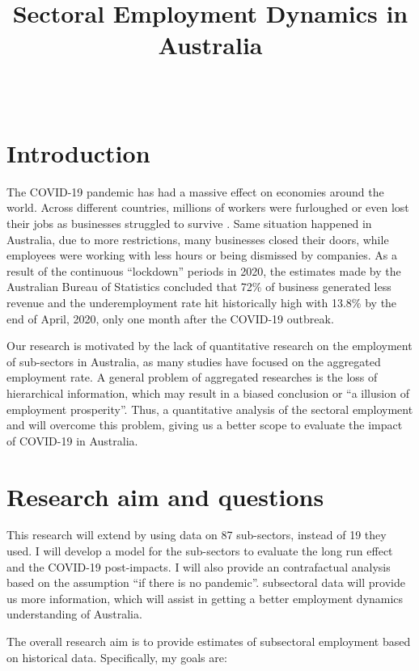 \documentclass[11pt,a4paper,]{article}
\title{Sectoral Employment Dynamics in Australia}
\author{\sf{\Large\textbf{(Elvis) Zhixiang Yang}\\\large EBS Honours Student\\[0.5cm]}}
\date{\sf\Date~\Month~\Year}
\makeatletter
\def\titlepage{\front{\expandafter{\@title}}{\@author}{\@organization}}
\makeatother
\begin{document}
\titlepage

\graphicspath{ {/Users/elvisyang/Desktop/Sectoral Employment Forecsating /Research_Proporsal/elvis_plan/figure} }

\hypertarget{introduction}{%
\section{Introduction}\label{introduction}}

The COVID-19 pandemic has had a massive effect on economies around the world. Across different countries, millions of workers were furloughed or even lost their jobs as businesses struggled to survive \autocite{ny2020}. Same situation happened in Australia, due to more restrictions, many businesses closed their doors, while employees were working with less hours or being dismissed by companies. As a result of the continuous ``lockdown'' periods in 2020, the estimates made by the Australian Bureau of Statistics \autocite{ABS2021} concluded that 72\% of business generated less revenue and the underemployment rate hit historically high with 13.8\% by the end of April, 2020, only one month after the COVID-19 outbreak.

Our research is motivated by the lack of quantitative research on the employment of sub-sectors in Australia, as many studies have focused on the aggregated employment rate. A general problem of aggregated researches is the loss of hierarchical information, which may result in a biased conclusion or ``a illusion of employment prosperity''. Thus, a quantitative analysis of the sectoral employment and will overcome this problem, giving us a better scope to evaluate the impact of COVID-19 in Australia.

\hypertarget{research-aim-and-questions}{%
\section{Research aim and questions}\label{research-aim-and-questions}}

This research will extend \textcite{anderson2020} by using data on 87 sub-sectors, instead of 19 they used. I will develop a model for the sub-sectors to evaluate the long run effect and the COVID-19 post-impacts. I will also provide an contrafactual analysis based on the assumption ``if there is no pandemic''. subsectoral data will provide us more information, which will assist in getting a better employment dynamics understanding of Australia.

The overall research aim is to provide estimates of subsectoral employment based on historical data. Specifically, my goals are:
\end{document}
